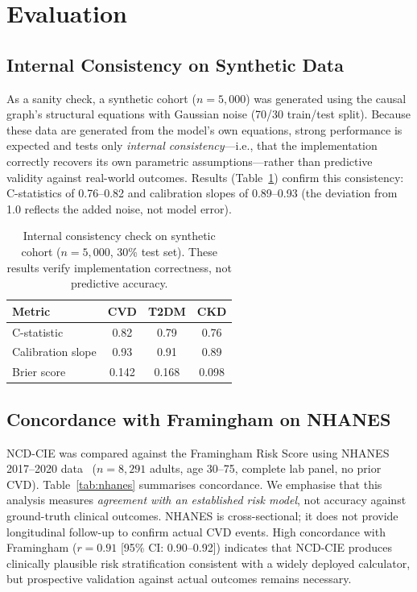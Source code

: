 \documentclass[runningheads]{llncs}
\begin{document}
\section{Evaluation}\label{sec:validation}

\subsection{Internal Consistency on Synthetic Data}\label{sec:synthetic}

As a sanity check, a synthetic cohort ($n = 5{,}000$) was generated
using the causal graph's structural equations with Gaussian noise
(70/30 train/test split).  Because these data are generated from the
model's own equations, strong performance is expected and tests only
\emph{internal consistency}---i.e., that the implementation correctly
recovers its own parametric assumptions---rather than predictive
validity against real-world outcomes.  Results
(Table~\ref{tab:synthetic}) confirm this consistency: C-statistics of
0.76--0.82 and calibration slopes of 0.89--0.93 (the deviation from
1.0 reflects the added noise, not model error).

\begin{table}[t]
\centering
\caption{Internal consistency check on synthetic cohort ($n = 5{,}000$,
30\% test set).  These results verify implementation correctness,
not predictive accuracy.}
\label{tab:synthetic}
\small
\begin{tabular}{@{}lccc@{}}
\toprule
\textbf{Metric} & \textbf{CVD} & \textbf{T2DM} & \textbf{CKD} \\
\midrule
C-statistic        & 0.82 & 0.79 & 0.76 \\
Calibration slope  & 0.93 & 0.91 & 0.89 \\
Brier score        & 0.142 & 0.168 & 0.098 \\
\bottomrule
\end{tabular}
\end{table}

\subsection{Concordance with Framingham on NHANES}\label{sec:nhanes}

NCD-CIE was compared against the Framingham Risk Score using NHANES
2017--2020 data~\cite{nhanes2020} ($n = 8{,}291$ adults, age 30--75,
complete lab panel, no prior CVD).  Table~\ref{tab:nhanes} summarises
concordance.  We emphasise that this analysis measures
\emph{agreement with an established risk model}, not accuracy against
ground-truth clinical outcomes.  NHANES is cross-sectional; it does
not provide longitudinal follow-up to confirm actual CVD events.
High concordance with Framingham ($r = 0.91$ [95\% CI: 0.90--0.92])
indicates that NCD-CIE produces clinically plausible risk
stratification consistent with a widely deployed calculator, but
prospective validation against actual outcomes remains necessary.
\end{document}
